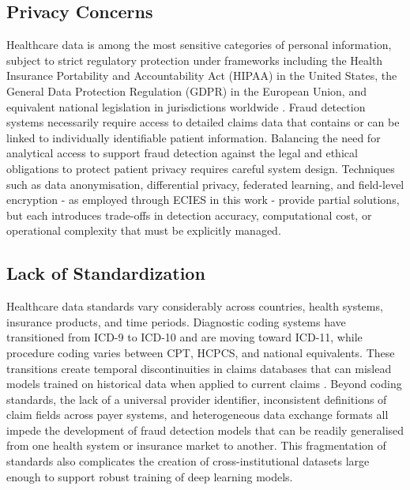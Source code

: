 \subsection{Privacy Concerns}

Healthcare data is among the most sensitive categories of personal information, subject to strict regulatory protection under frameworks including the Health Insurance Portability and Accountability Act (HIPAA) in the United States, the General Data Protection Regulation (GDPR) in the European Union, and equivalent national legislation in jurisdictions worldwide \cite{he2019}. Fraud detection systems necessarily require access to detailed claims data that contains or can be linked to individually identifiable patient information. Balancing the need for analytical access to support fraud detection against the legal and ethical obligations to protect patient privacy requires careful system design. Techniques such as data anonymisation, differential privacy, federated learning, and field-level encryption - as employed through ECIES in this work - provide partial solutions, but each introduces trade-offs in detection accuracy, computational cost, or operational complexity that must be explicitly managed.

\subsection{Lack of Standardization}

Healthcare data standards vary considerably across countries, health systems, insurance products, and time periods. Diagnostic coding systems have transitioned from ICD-9 to ICD-10 and are moving toward ICD-11, while procedure coding varies between CPT, HCPCS, and national equivalents. These transitions create temporal discontinuities in claims databases that can mislead models trained on historical data when applied to current claims \cite{eling2018}. Beyond coding standards, the lack of a universal provider identifier, inconsistent definitions of claim fields across payer systems, and heterogeneous data exchange formats all impede the development of fraud detection models that can be readily generalised from one health system or insurance market to another. This fragmentation of standards also complicates the creation of cross-institutional datasets large enough to support robust training of deep learning models.

